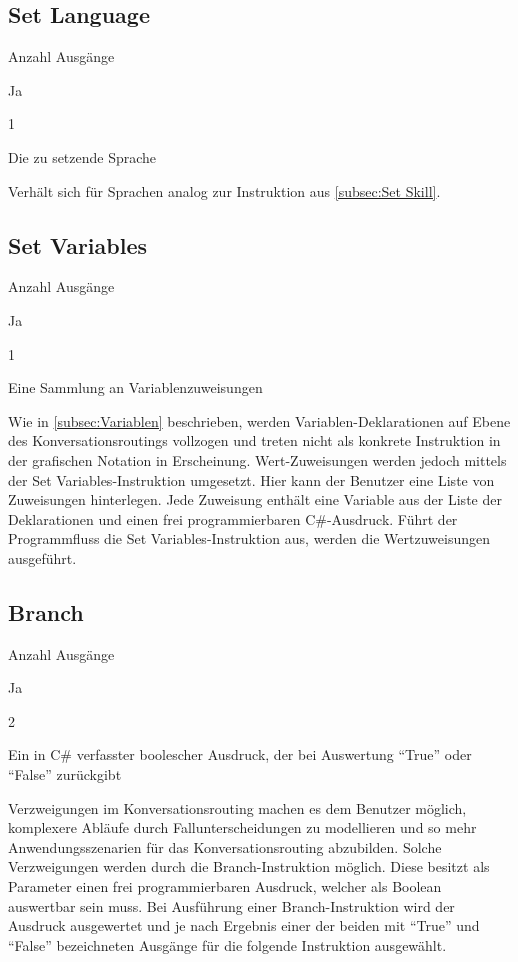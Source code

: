 \subsection{Set Language}
\label{subsec:Set Language}
\begin{labeling}{Anzahl Ausgänge}
\item [Eingang] Ja
\item [Anzahl Ausgänge] 1
\item [Parameter] Die zu setzende Sprache
\item [Beschreibung] Verhält sich für Sprachen analog zur Instruktion aus \ref{subsec:Set Skill}.
\end{labeling}

\subsection{Set Variables}
\label{subsec:Set Variables}
\begin{labeling}{Anzahl Ausgänge}
\item [Eingang] Ja
\item [Anzahl Ausgänge] 1
\item [Parameter] Eine Sammlung an Variablenzuweisungen
\item [Beschreibung] Wie in \ref{subsec:Variablen} beschrieben, werden Variablen-Deklarationen auf Ebene des Konversationsroutings vollzogen und treten nicht als konkrete Instruktion in der grafischen Notation in Erscheinung. Wert-Zuweisungen werden jedoch mittels der Set Va\-ria\-bles-In\-struk\-tion umgesetzt. Hier kann der Benutzer eine Liste von Zuweisungen hinterlegen. Jede Zuweisung enthält eine Variable aus der Liste der Deklarationen und einen frei programmierbaren C\#-Ausdruck. Führt der Programmfluss die Set Variables-Instruktion aus, werden die Wertzuweisungen ausgeführt.
\end{labeling}

\subsection{Branch}
\begin{labeling}{Anzahl Ausgänge}
\item [Eingang] Ja
\item [Anzahl Ausgänge] 2
\item [Parameter] Ein in C\# verfasster boolescher Ausdruck, der bei Auswertung ``True'' oder ``False'' zurückgibt
\item [Beschreibung] Verzweigungen im Konversationsrouting machen es dem Benutzer möglich, komplexere Abläufe durch Fallunterscheidungen zu modellieren und so mehr Anwendungsszenarien für das Konversationsrouting abzubilden. Solche Verzweigungen werden durch die  Branch-Instruktion möglich. Diese besitzt als Parameter einen frei programmierbaren Ausdruck, welcher als Boolean auswertbar sein muss. Bei Ausführung einer Branch-Instruktion wird der Ausdruck ausgewertet und je nach Ergebnis einer der beiden mit ``True'' und ``False'' bezeichneten Ausgänge für die folgende Instruktion ausgewählt.
\end{labeling}


